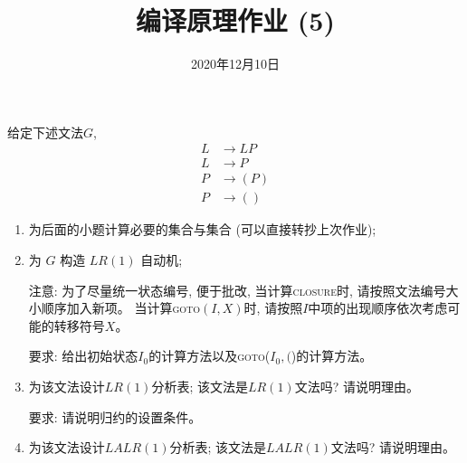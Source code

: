\documentclass[a4paper, justified]{tufte-handout}
\title{编译原理作业 (5)}
\date{2020年12月10日}
\begin{document}
\maketitle
\noplagiarism %
\begin{abstract}
\end{abstract}
\beginrequired

\begin{problem}[\score{10 = 1 + 4 + 2 + 3}]
  给定下述文法$G$,
  \begin{align}
    L &\to LP \\[8pt]
    L &\to P \\[8pt]
    P &\to (P) \\[8pt]
    P &\to ()
  \end{align}

  \begin{enumerate}[(1)]
    \item 为后面的小题计算必要的\first{}集合与\follow{}集合 (可以直接转抄上次作业);
    \item 为 $G$ 构造 $LR(1)$ 自动机;

      注意: 为了尽量统一状态编号, 便于批改, 当计算\textsc{closure}时, 请按照文法编号大小顺序加入新项。
      当计算\textsc{goto}$(I, X)$时, 请按照$I$中项的出现顺序依次考虑可能的转移符号$X$。

      要求: 给出初始状态$I_{0}$的计算方法以及\textsc{goto}($I_{0}, ($)的计算方法。
    \item 为该文法设计$LR(1)$分析表; 该文法是$LR(1)$文法吗? 请说明理由。

      要求: 请说明归约的设置条件。
    \item 为该文法设计$LALR(1)$分析表; 该文法是$LALR(1)$文法吗? 请说明理由。
  \end{enumerate}
\end{problem}
\end{document}
